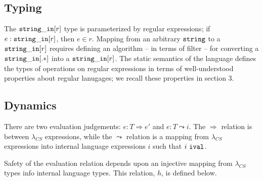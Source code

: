 \documentclass[10pt,preprint]{sigplanconf}
\theoremstyle{definition}
\newcommand{\strin}{{\tt string\_in}}
\newcommand{\str}{ {\tt string} }
\newcommand{\reduces}{ \Rightarrow }
\newcommand{\ireduces}{ \leadsto }
\newcommand{\ival}{ \ {\tt ival} }
\newcommand{\lcs}{\lambda_{CS}}
\begin{document}
\subsection{Typing}

The $\strin[r]$ type is parameterized by regular expressions; if $e:\strin[r]$,
then $e \in r$. Mapping from an arbitrary $\str$ to a $\strin[r]$ requires
defining an algorithm -- in terms of filter -- for converting a $\strin[.*]$
into a $\strin[r]$. The static semantics of the language defines the types of
operations on regular expressions in terms of well-understood properties about
regular lanugages; we recall these properties in section 3.

\subsection{Dynamics}

There are two evaluation judgements: $e:T \reduces e'$ and $e:T \ireduces i$.
The $\reduces$ relation is between $\lcs$ expressions, while the $\ireduces$
relation is a mapping from $\lcs$ expressions into internal language expressions
$i$ such that $i \ival$.

Safety of the evaluation relation depends upon an injective mapping from $\lcs$ types info
internal language types. This relation, $h$, is defined below.
\end{document}
